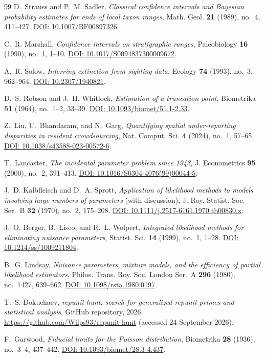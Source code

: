 \documentclass[11pt,a4paper]{article}
\theoremstyle{plain}
\theoremstyle{remark}
\begin{document}
\begin{thebibliography}{99}
 D.~Strauss and P.~M. Sadler, \emph{Classical
confidence intervals and Bayesian probability estimates for ends of local taxon
ranges}, Math. Geol. \textbf{21} (1989), no.~4, 411--427.
\href{https://doi.org/10.1007/BF00897326}{DOI: 10.1007/BF00897326}.

 C.~R. Marshall, \emph{Confidence intervals on
stratigraphic ranges}, Paleobiology \textbf{16} (1990), no.~1, 1--10.
\href{https://doi.org/10.1017/S0094837300009672}{DOI:
10.1017/S0094837300009672}.

 A.~R. Solow, \emph{Inferring extinction from sighting data},
Ecology \textbf{74} (1993), no.~3, 962--964.
\href{https://doi.org/10.2307/1940821}{DOI: 10.2307/1940821}.

 D.~S. Robson and J.~H. Whitlock, \emph{Estimation
of a truncation point}, Biometrika \textbf{51} (1964), no.~1--2, 33--39.
\href{https://doi.org/10.1093/biomet/51.1-2.33}{DOI:
10.1093/biomet/51.1-2.33}.

 Z.~Liu, U.~Bhandaram, and N.~Garg, \emph{Quantifying spatial
under-reporting disparities in resident crowdsourcing}, Nat. Comput. Sci.
\textbf{4} (2024), no.~1, 57--65.
\href{https://doi.org/10.1038/s43588-023-00572-6}{DOI:
10.1038/s43588-023-00572-6}.

 T.~Lancaster, \emph{The incidental parameter problem
since 1948}, J. Econometrics \textbf{95} (2000), no.~2, 391--413.
\href{https://doi.org/10.1016/S0304-4076(99)00044-5}{DOI:
10.1016/S0304-4076(99)00044-5}.

 J.~D. Kalbfleisch and D.~A. Sprott,
\emph{Application of likelihood methods to models involving large numbers of
parameters} (with discussion), J. Roy. Statist. Soc. Ser.~B \textbf{32} (1970),
no.~2, 175--208.
\href{https://doi.org/10.1111/j.2517-6161.1970.tb00830.x}{DOI:
10.1111/j.2517-6161.1970.tb00830.x}.

 J.~O. Berger, B.~Liseo, and R.~L. Wolpert,
\emph{Integrated likelihood methods for eliminating nuisance parameters},
Statist. Sci. \textbf{14} (1999), no.~1, 1--28.
\href{https://doi.org/10.1214/ss/1009211804}{DOI: 10.1214/ss/1009211804}.

 B.~G. Lindsay, \emph{Nuisance parameters, mixture models,
and the efficiency of partial likelihood estimators}, Philos. Trans. Roy. Soc.
London Ser.~A \textbf{296} (1980), no.~1427, 639--662.
\href{https://doi.org/10.1098/rsta.1980.0197}{DOI: 10.1098/rsta.1980.0197}.

 T.~S. Dokuchaev, \emph{repunit-hunt: search for
generalized repunit primes and statistical analysis}, GitHub repository, 2026.
\url{https://github.com/Wilps93/repunit-hunt} (accessed 24 September 2026).

 F.~Garwood, \emph{Fiducial limits for the Poisson
distribution}, Biometrika \textbf{28} (1936), no.~3--4, 437--442.
\href{https://doi.org/10.1093/biomet/28.3-4.437}{DOI:
10.1093/biomet/28.3-4.437}.

\end{thebibliography}
\end{document}
